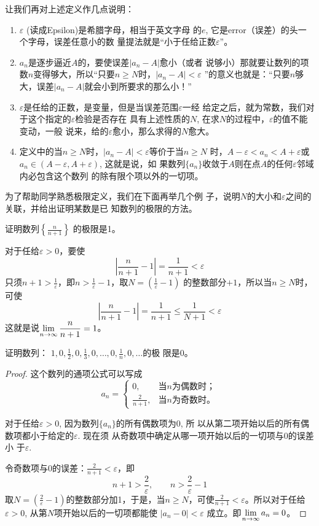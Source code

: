 让我们再对上述定义作几点说明：
\begin{enumerate}
\item $\varepsilon$ (读成Epsilon)是希腊字母，相当于英文字母
的$e$, 它是error（误差）的头一个字母，误差任意小的数
量提法就是“小于任给正数$\varepsilon$”。
\item $a_n$是逐步逼近$A$的，要使误差$|a_n-A|$愈小（或者
说够小）那就要让数列的项数$n$变得够大，所以“只要$n\ge
N$时，$|a_n-A|<\varepsilon$ ”的意义也就是：“只要$n$够大，误差$|a_n
-A|$就会小到所要求的那么小！”
\item $\varepsilon$是任给的正数，是变量，但是当误差范围$\varepsilon$一经
给定之后，就为常数，我们对于这个指定的$\varepsilon$检验是否存在
具有上述性质的$N$, 在求$N$的过程中，$\varepsilon$的值不能变动，一般
说来，给的$\varepsilon$愈小，那么求得的$N$愈大。
\item 定义中的当$n\ge N$时，$|a_n-A|<\varepsilon$等价于当$n\ge N$
时，$A-\varepsilon<a_n<A+\varepsilon$或$a_n\in (A-\varepsilon,A+\varepsilon)$, 这就是说，如
果数列$\{a_n\}$收敛于$A$则在点$A$的任何$\varepsilon$邻域内必包含这个数列
的除有限个项以外的一切项。
\end{enumerate}


为了帮助同学熟悉极限定义，我们在下面再举几个例
子，说明$N$的大小和$\varepsilon$之间的关联，并给出证明某数是已
知数列的极限的方法。

\begin{example}
    证明数列$\left\{\frac{n}{n+1}\right\}$
的极限是1。
\end{example}

\begin{solution}
对于任给$\varepsilon>0$，要使
\[\left|\frac{n}{n+1}-1\right|=\frac{1}{n+1}<\varepsilon\]
只须$n+1>\frac{1}{\varepsilon}$，即$n>\frac{1}{\varepsilon}-1$，取$N=\left(\frac{1}{\varepsilon}-1\right)$
的整数部分$+1$，所以当$n\ge N$时，可使
\[\left|\frac{n}{n+1}-1\right|=\frac{1}{n+1}\le \frac{1}{N+1}<\varepsilon\]
    这就是说$\displaystyle\lim_{n\to\infty}\dfrac{n}{n+1}=1$。
\end{solution}

\begin{example}
    证明数列：
$1,0,\frac{1}{2},0,\frac{1}{3},0,\ldots,0,\frac{1}{n},0,\ldots$的极
限是0。
\end{example}

\begin{proof}
  这个数列的通项公式可以写成
\[a_n=\begin{cases}
    0,& \text{当$n$为偶数时；}\\
   \frac{2}{n+1},& \text{当$n$为奇数时。}
\end{cases}\]

对于任给$\varepsilon>0$, 因为数列$\{a_n\}$的所有偶数项为0, 所
以从第二项开始以后的所有偶数项都小于给定的$\varepsilon$. 现在须
从奇数项中确定从哪一项开始以后的一切项与0的误差小
于$\varepsilon$. 

令奇数项与0的误差：$\frac{2}{n+1}<\varepsilon$，即
\[n+1>\frac{2}{\varepsilon},\qquad n>\frac{2}{\varepsilon}-1\]  
取$N=\left(\frac{2}{\varepsilon}-1\right)$的整数部分加1，于是，当$n\ge N$，可使$\frac{2}{n+1}<\varepsilon$。所以对于任给$\varepsilon>0$, 从第$N$项开始以后的一切项都能使
$|a_n-0|<\varepsilon$
成立。即$\displaystyle\lim_{n\to\infty}a_n=0$。
\end{proof}


